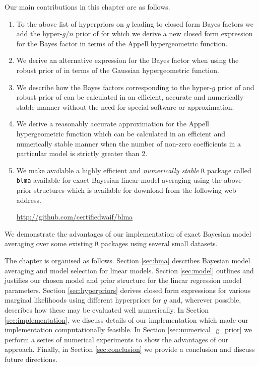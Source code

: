 Our main contributions in this chapter are as follows.
\begin{enumerate}
	\item To the above list of hyperpriors on $g$ leading to closed form Bayes factors
	we add the  hyper-$g/n$ prior of \cite{Liang2008} for which we
	derive a new closed form expression for the Bayes factor in terms
	of the Appell hypergeometric function.
	
	\item We derive an alternative expression for the Bayes factor when using the
	robust prior of \cite{Bayarri2012} in terms of the Gaussian hypergeometric function.
	
	\item We describe how the  Bayes factors corresponding to the hyper-$g$ prior of \cite{Liang2008} 
	and robust prior of \cite{Bayarri2012} can be calculated in an efficient, accurate and numerically 
	stable manner without the need for special software or approximation.
	
	\item We derive a reasonably accurate approximation for the Appell hypergeometric function
	which can be calculated in an efficient and numerically 
	stable manner when the number of non-zero coefficients in a particular model is strictly greater than 2.
	
	\item We make available a highly efficient and {\it numerically stable} {\tt R}
	package called
	{\tt blma} available
	for exact Bayesian linear model averaging 
	using the above prior structures which is available for download from the following web address.
	
	\begin{center}
		\url{http://github.com/certifiedwaif/blma}
	\end{center}

\end{enumerate}

\noindent 
We demonstrate the advantages of our implementation of exact Bayesian model
averaging over some existing {\tt R}
packages using several small datasets.


The chapter is organised as follows. Section \ref{sec:bma} describes Bayesian model averaging and model
selection for linear models. Section \ref{sec:model} outlines and justifies our chosen model and prior structure for the linear regression model parameters. Section 
\ref{sec:hyperpriors} derives closed form expressions for various marginal likelihoods using 
different hyperpriors for $g$ and, wherever possible, describes how these may be evaluated well numerically.
In Section \ref{sec:implementation}, we discuss details of our implementation which made our implementation 
computationally feasible.
In Section \ref{sec:numerical_g_prior} we perform a series of numerical experiments to show the advantages of our approach. 
Finally, in Section \ref{sec:conclusion} we provide a conclusion and discuss future
directions.
















